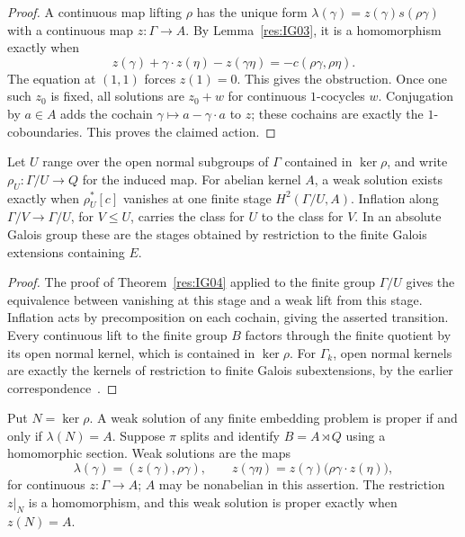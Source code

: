 \begin{proof}
A continuous map lifting \(\rho\) has the unique form
\(\lambda(\gamma)=z(\gamma)s(\rho\gamma)\) with a continuous
map \(z\colon\Gamma\to A\). By Lemma~\ref{res:IG03}, it is a
homomorphism exactly when
\[
   z(\gamma)+\gamma\cdot z(\eta)-z(\gamma\eta)
           =-c(\rho\gamma,\rho\eta).
\]
The equation at \((1,1)\) forces \(z(1)=0\).
This gives the obstruction. Once one such \(z_0\) is fixed, all
solutions are \(z_0+w\) for continuous \(1\)-cocycles \(w\).
Conjugation by \(a\in A\) adds the cochain
\(\gamma\mapsto a-\gamma\cdot a\) to \(z\); these cochains are
exactly the \(1\)-coboundaries. This proves the claimed action.
\end{proof}

\begin{corollary}
\label{res:IG05}
Let \(U\) range over the open normal subgroups of \(\Gamma\) contained
in \(\ker\rho\), and write \(\rho_U\colon\Gamma/U\to Q\) for
the induced map. For abelian kernel \(A\), a weak solution exists
exactly when \(\rho_U^*[c]\) vanishes at one finite stage
\(H^2(\Gamma/U,A)\). Inflation along
\(\Gamma/V\to\Gamma/U\), for \(V\leq U\), carries the class
for \(U\) to the class for \(V\). In an absolute Galois group these
are the stages obtained by restriction to the finite Galois
extensions containing \(E\).
\end{corollary}

\begin{proof}
The proof of Theorem~\ref{res:IG04} applied to the finite group
\(\Gamma/U\) gives the equivalence between vanishing at this
stage and a weak lift from this stage. Inflation acts by
precomposition on each cochain, giving the asserted transition.
Every continuous lift to the finite group \(B\) factors through
the finite quotient by its open normal kernel, which is contained
in \(\ker\rho\). For \(\Gamma_k\), open normal kernels are exactly
the kernels of restriction to finite Galois subextensions, by
the earlier correspondence~\cite[Results C06 and C08--C09]{mg-aft}.
\end{proof}

\begin{proposition}
\label{res:IG06}
Put \(N=\ker\rho\). A weak solution of any finite embedding problem
is proper if and only if \(\lambda(N)=A\).
Suppose \(\pi\) splits and identify \(B=A\rtimes Q\) using a
homomorphic section. Weak solutions are the maps
\[
 \lambda(\gamma)=(z(\gamma),\rho\gamma),\qquad
 z(\gamma\eta)=z(\gamma)\bigl(\rho\gamma\cdot z(\eta)\bigr),
\]
for continuous \(z\colon\Gamma\to A\); \(A\) may be nonabelian
in this assertion. The restriction \(z|_N\) is a homomorphism,
and this weak solution is proper exactly when \(z(N)=A\).
\end{proposition}

